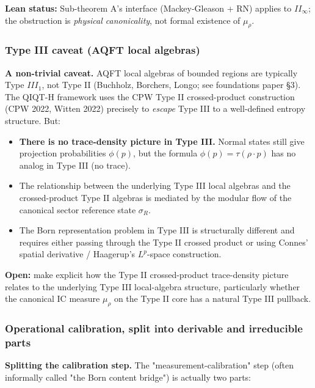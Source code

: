 \documentclass[11pt,a4paper]{article}
\begin{document}
\textbf{Lean status:} Sub-theorem A's interface (Mackey-Gleason + RN) applies to $II_\infty$; the obstruction is \emph{physical canonicality}, not formal existence of $\mu_\rho$.

\subsubsection{Type III caveat (AQFT local algebras)}

\textbf{A non-trivial caveat.} AQFT local algebras of bounded regions are typically Type $III_1$, not Type II (Buchholz, Borchers, Longo; see foundations paper §3). The QIQT-H framework uses the CPW Type II crossed-product construction (CPW 2022, Witten 2022) precisely to \emph{escape} Type III to a well-defined entropy structure. But:

\begin{itemize}
  \item \textbf{There is no trace-density picture in Type III.} Normal states still give projection probabilities $\phi(p)$, but the formula $\phi(p) = \tau(\rho \cdot p)$ has no analog in Type III (no trace).
  \item The relationship between the underlying Type III local algebras and the crossed-product Type II algebras is mediated by the modular flow of the canonical sector reference state $\sigma_R$.
  \item The Born representation problem in Type III is structurally different and requires either passing through the Type II crossed product or using Connes' spatial derivative / Haagerup's $L^p$-space construction.
\end{itemize}

\textbf{Open:} make explicit how the Type II crossed-product trace-density picture relates to the underlying Type III local-algebra structure, particularly whether the canonical IC measure $\mu_\rho$ on the Type II core has a natural Type III pullback.

\subsubsection{Operational calibration, split into derivable and irreducible parts}

\textbf{Splitting the calibration step.} The "measurement-calibration" step (often informally called "the Born content bridge") is actually two parts:
\end{document}
